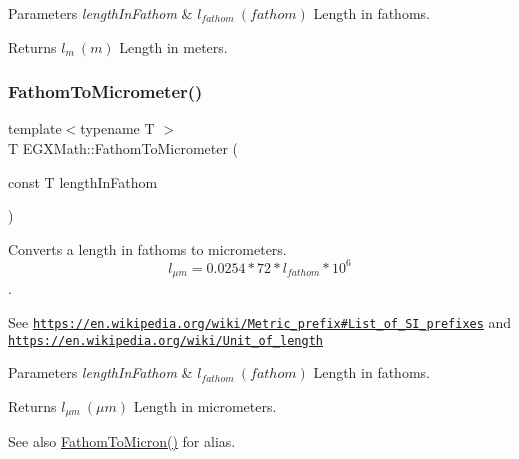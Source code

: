 \begin{DoxyParams}{Parameters}
{\em length\+In\+Fathom} & $ l_{fathom}\ (fathom)$ Length in fathoms. \\
\hline
\end{DoxyParams}
\begin{DoxyReturn}{Returns}
$ l_{m}\ (m)$ Length in meters. 
\end{DoxyReturn}
\mbox{\label{group___e_g_x_math-_conversions-_length_conversions-_imperial-_fathom-_s_i_gabc04c2f094545c3ae8d4e493e4af417e}} 
\subsubsection{\texorpdfstring{Fathom\+To\+Micrometer()}{FathomToMicrometer()}}
{\footnotesize\ttfamily template$<$typename T $>$ \\
T E\+G\+X\+Math\+::\+Fathom\+To\+Micrometer (\begin{DoxyParamCaption}\item[{const T}]{length\+In\+Fathom }\end{DoxyParamCaption})}



Converts a length in fathoms to micrometers. \[ l_{\mu m}=0.0254 * 72 * l_{fathom} * 10^{6} \]. 

See \href{https://en.wikipedia.org/wiki/Metric_prefix#List_of_SI_prefixes}{\tt https\+://en.\+wikipedia.\+org/wiki/\+Metric\+\_\+prefix\#\+List\+\_\+of\+\_\+\+S\+I\+\_\+prefixes} and \href{https://en.wikipedia.org/wiki/Unit_of_length}{\tt https\+://en.\+wikipedia.\+org/wiki/\+Unit\+\_\+of\+\_\+length} 
\begin{DoxyParams}{Parameters}
{\em length\+In\+Fathom} & $ l_{fathom}\ (fathom)$ Length in fathoms. \\
\hline
\end{DoxyParams}
\begin{DoxyReturn}{Returns}
$ l_{\mu m}\ (\mu m)$ Length in micrometers. 
\end{DoxyReturn}
\begin{DoxySeeAlso}{See also}
\mbox{\hyperlink{group___e_g_x_math-_conversions-_length_conversions-_imperial-_fathom-_non-_s_i_ga491b6bb1b4db49ba22471e9ca9855198}{Fathom\+To\+Micron()}} for alias. 
\end{DoxySeeAlso}
\mbox{\label{group___e_g_x_math-_conversions-_length_conversions-_imperial-_fathom-_s_i_gaa9e44fa377dc5d69f70d3974311ec89d}} 
